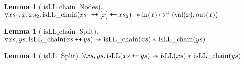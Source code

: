 \documentclass[a4paper, 10pt]{report}
\theoremstyle{definition}
\newtheorem{lemma}[theorem]{Lemma}
\newcommand{\isLLchain}{\operatorname{isLL\_chain}}
\newcommand{\isLL}{\operatorname{isLL}}
\newcommand{\nIn}[1]{\operatorname{in}(#1)}
\newcommand{\nVal}[1]{\operatorname{val}(#1)}
\newcommand{\nOut}[1]{\operatorname{out}(#1)}
\newcommand\catenate{\mathbin{\text{\ttfamily\upshape ++}}}
\newcommand{\isNode}[1]{\nIn{#1} \mapsto^{\persistently} (\nVal{#1}, \nOut{#1})}
\begin{document}
\begin{lemma}[$\isLLchain$ Nodes]\label{lemma:isLL-chain-nodes}
  $\All xs_1, x, xs_2.\\
   \isLLchain(xs_1 \catenate [x] \catenate xs_2) \wand \isNode{x}$
\end{lemma}

\begin{lemma}[$\isLLchain$ Split]\label{lemma:isLL-chain-split}
  $\All xs, ys.\\
   \isLLchain(xs \catenate ys) \wand \isLLchain(xs) \star{} \isLLchain(ys)$
\end{lemma}

\begin{lemma}[$\isLL$ Split]\label{lemma:isLL-split}
  $\All xs, ys.\\
   \isLL(xs \catenate ys) \wand \isLL(xs) \star{} \isLLchain(ys)$
\end{lemma}
\end{document}
